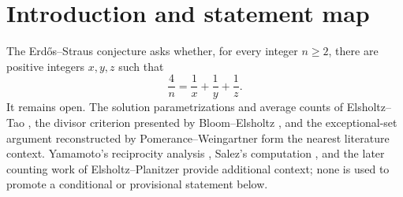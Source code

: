 \documentclass[10pt,reqno]{amsart}
\theoremstyle{definition}
\newcommand{\Rcal}{\mathscr R}
\newcommand{\1}{\mathbf 1}
\newcommand{\PF}{H_{\mathrm{PF}}}
\begin{document}
\begin{abstract}
For $M\equiv3\pmod4$ and $A=(M+1)/4$, the intrinsic forbidden set is
\[
 \Rcal(M)=\{-4D\pmod M:D\mid A^2\}.
\]
Its deduplicated mass through $X$ is $\Theta((\log X)^3)$; the prime-modulus
subsystem has mass $\Theta((\log X)^2)$ and avoider density
$\exp\{-\Theta((\log X)^2)\}$.  Every square avoids the full system.

A weighted rough-modulus estimate and the Lov\'asz local lemma refute the
literal all-range partition-free hypothesis $\PF$ by proving
\[
 \delta_X\geq\exp\!\left\{-O\!\left(\frac{(\log X)^3\log\log\log X}
 {\log\log X}\right)\right\}=\exp\{-o((\log X)^3)\}.
\]
This does not reach the critical window $\log N\asymp(\log X)^4$.  The
provisional $3/4$ argument instead uses the fixed $c$-free family,
residue-resolved moments, Theorem~\ref{thm:pruned}'s conditioned void, and
an even-Bonferroni majorant with the honest $\exp\{O((\log X)^4)\}$ ledger;
the earlier $\exp\{O(J)\}$ clause remains unproved and is bypassed.  At the
residue-dispersion frontier, divisor-cube and semiprime-grid constructions
refute the raw and implication-antichain moment formulations, not the
critical-window hypothesis, pair endpoint, or conjecture.  The exact
residual collision sum remains \textsc{open}.  A proved slice criterion reduces the pointwise question to a bespoke
unproved hypothesis; the standard-hypothesis audit does not prove it.
\end{abstract}

\maketitle
\tableofcontents

\section{Introduction and statement map}
The Erd\H{o}s--Straus conjecture asks whether, for every integer $n\geq2$, there are positive integers $x,y,z$ such that
\begin{equation}\label{eq:ES}
 \frac4n=\frac1x+\frac1y+\frac1z.
\end{equation}
It remains open.  The solution parametrizations and average counts of Elsholtz--Tao \cite{ElsholtzTao}, the divisor criterion presented by Bloom--Elsholtz \cite{BloomElsholtz}, and the exceptional-set argument reconstructed by Pomerance--Weingartner \cite{PomeranceWeingartner} form the nearest literature context.  Yamamoto's reciprocity analysis \cite{Yamamoto}, Salez's computation \cite{Salez}, and the later counting work of Elsholtz--Planitzer \cite{ElsholtzPlanitzer} provide additional context; none is used to promote a conditional or provisional statement below.
\end{document}

